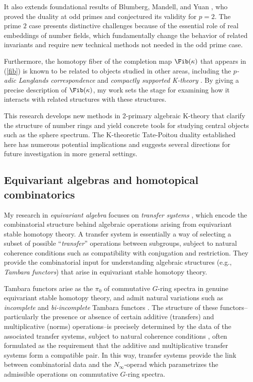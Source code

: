 \documentclass[11pt]{article}
\begin{document}
It also extends foundational results of Blumberg, Mandell, and Yuan \cite{MR4121155,BMY}, who proved the duality at odd primes and conjectured its validity for $p=2$. The prime $2$ case presents distinctive challenges because of the essential role of real embeddings of number fields, which fundamentally change the behavior of related invariants and require new technical methods not needed in the odd prime case.

Furthermore, the homotopy fiber of the completion map $\Fib(\ka)$ that appears in (\ref{fib}) is known to be related to objects studied in other areas, including the {\it $p$-adic Langlands correspondence} \cite{MR2905536} and {\it compactly supported K-theory} \cite{MR3211458}. 
By giving a precise description of $\Fib(\ka)$, my work sets the stage for examining how it interacts with related structures with these structures.

This research develops new methods in 2-primary algebraic K-theory that clarify the structure of number rings and yield concrete tools for studying central objects such as the sphere spectrum.
The K-theoretic Tate-Poitou duality established here has numerous potential implications and suggests several directions for future investigation in more general settings.



\subsection{Equivariant algebras and homotopical combinatorics}
My research in {\it equivariant algebra} focuses on {\it transfer systems} \cite{MR4244201}, which encode the combinatorial structure behind algebraic operations arising from equivariant stable homotopy theory.
A transfer system is essentially a way of selecting a subset of possible ``{\it transfer}'' operations between subgroups, subject to natural coherence conditions such as compatibility with conjugation and restriction.
They provide the combinatorial input for understanding algebraic structures (e.g., {\it Tambara functors}) that arise in equivariant stable homotopy theory.

Tambara functors \cite{MR1209937} arise as the $\pi_0$ of commutative $G$-ring spectra in genuine equivariant stable homotopy theory, and admit natural variations such as {\it incomplete} and {\it bi-incomplete} Tambara functors \cite{MR3773736,MR4327103}.
The structure of these functors--particularly the presence or absence of certain additive (transfers) and multiplicative (norms) operations--is precisely determined by the data of the associated transfer systems, subject to natural coherence conditions \cite{MR4696086}, often formulated as the requirement that the additive and multiplicative transfer systems form a compatible pair.
In this way, transfer systems provide the link between combinatorial data and the $N_\infty$-operad which parametrizes the admissible operations on commutative $G$-ring spectra.
\end{document}
